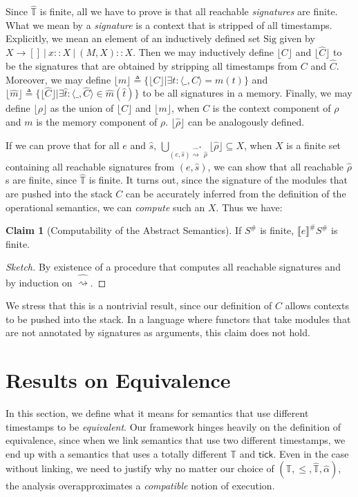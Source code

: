 \documentclass{article}
\theoremstyle{definition}
\newtheorem{clm}{Claim}[section]
\newcommand*{\A}[1]{\widehat{#1}}
\newcommand*{\Abs}[1]{{#1}^{\#}}
\newcommand*{\Time}{\mathbb{T}}
\newcommand*{\ATime}{\A{\Time}}
\newcommand*{\Sig}{\text{Sig}}
\newcommand*{\semarrow}{\rightsquigarrow}
\newcommand*{\asemarrow}{\widehat{\rightsquigarrow}}
\newcommand*{\sembracket}[1]{\lBrack{#1}\rBrack}
\newcommand*{\tick}{\mathsf{tick}}
\begin{document}
Since $\ATime$ is finite, all we have to prove is that all reachable \emph{signatures} are finite.
What we mean by a \emph{signature} is a context that is stripped of all timestamps.
Explicitly, we mean an element of an inductively defined set $\Sig$ given by $X\rightarrow []\:|\:x::X\:|\:(M,X)::X$.
Then we may inductively define $\lfloor C\rfloor$ and $\lfloor \A{C}\rfloor$ to be the signatures that are obtained by stripping all timestamps from $C$ and $\A{C}$.
Moreover, we may define $\lfloor m\rfloor\triangleq\{\lfloor C\rfloor|\exists t:\langle\_,C\rangle=m(t)\}$ and $\lfloor\A{m}\rfloor\triangleq\{\lfloor\A{C}\rfloor|\exists\A{t}:\langle\_,\A{C}\rangle\in\A{m}(\A{t})\}$ to be all signatures in a memory.
Finally, we may define $\lfloor\rho\rfloor$ as the union of $\lfloor C\rfloor$ and $\lfloor m\rfloor$, when $C$ is the context component of $\rho$ and $m$ is the memory component of $\rho$.
$\lfloor\A\rho\rfloor$ can be analogously defined.

If we can prove that for all $e$ and $\A{s}$, $\bigcup_{(e,\A{s})\A\semarrow^*\A\rho}\lfloor\A\rho\rfloor\subseteq X$, when $X$ is a finite set containing all reachable signatures from $(e,\A{s})$, we can show that all reachable $\A\rho$s are finite, since $\ATime$ is finite.
It turns out, since the signature of the modules that are pushed into the stack $C$ can be accurately inferred from the definition of the operational semantics, we can \emph{compute} such an $X$.
Thus we have:
\begin{clm}[Computability of the Abstract Semantics]
  If $\Abs{S}$ is finite, $\Abs{\sembracket{e}}\Abs{S}$ is finite.
\end{clm}
\begin{proof}[Sketch]
  By existence of a procedure that computes all reachable signatures and by induction on $\asemarrow$.
\end{proof}

We stress that this is a nontrivial result, since our definition of $C$ allows contexts to be pushed into the stack.
In a language where functors that take modules that are not annotated by signatures as arguments, this claim does not hold.

\section{Results on Equivalence}
In this section, we define what it means for semantics that use different timestamps to be \emph{equivalent}.
Our framework hinges heavily on the definition of equivalence, since when we link semantics that use two different timestamps, we end up with a semantics that uses a totally different $\Time$ and $\tick$.
Even in the case without linking, we need to justify why no matter our choice of $(\Time,\le,\ATime,\A\alpha)$, the analysis overapproximates a \emph{compatible} notion of execution.
\end{document}

